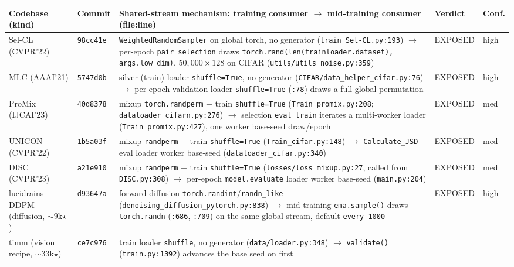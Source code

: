 \documentclass[10pt,letterpaper]{article}
\theoremstyle{remark}
\newcommand{\code}[1]{\texttt{#1}}
\begin{document}
\begin{table}[tbp]
\centering
\footnotesize
\setlength{\tabcolsep}{4pt}
\begin{tabular}{@{}L{2.15cm}L{1.0cm}L{6.4cm}L{1.15cm}L{1.0cm}@{}}
\toprule
Codebase (kind) & Commit & Shared-stream mechanism: training consumer $\to$
mid-training consumer (file:line) & Verdict & Conf. \\
\midrule
Sel-CL (CVPR'22) & \code{98cc41e} &
\code{WeightedRandomSampler} on global torch, no generator
(\code{train\_Sel-CL.py:193}) $\to$ per-epoch \code{pair\_selection} draws
\code{torch.rand(len(trainloader.dataset), args.low\_dim)}, $50{,}000\times128$
on CIFAR (\code{utils/utils\_noise.py:359}) &
EXPOSED & high \\
\addlinespace
MLC (AAAI'21) & \code{5747d0b} &
silver (train) loader \code{shuffle=True}, no generator
(\code{CIFAR/data\_helper\_cifar.py:76}) $\to$ per-epoch validation loader
\code{shuffle=True} (\code{:78}) draws a full global permutation &
EXPOSED & high \\
\addlinespace
ProMix (IJCAI'23) & \code{40d8378} &
mixup \code{torch.randperm} + train \code{shuffle=True}
(\code{Train\_promix.py:208}; \code{dataloader\_cifarn.py:276}) $\to$
selection \code{eval\_train} iterates a multi-worker loader
(\code{Train\_promix.py:427}), one worker base-seed draw/epoch & EXPOSED & med \\
\addlinespace
UNICON (CVPR'22) & \code{1b5a03f} &
mixup \code{randperm} + train \code{shuffle=True}
(\code{Train\_cifar.py:148}) $\to$ \code{Calculate\_JSD} eval loader
worker base-seed (\code{dataloader\_cifar.py:340}) & EXPOSED & med \\
\addlinespace
DISC (CVPR'23) & \code{a21e910} &
mixup \code{randperm} + train \code{shuffle=True}
(\code{losses/loss\_mixup.py:27}, called from \code{DISC.py:308}) $\to$
per-epoch \code{model.evaluate} loader worker base-seed (\code{main.py:204}) & EXPOSED & med \\
\addlinespace
lucidrains DDPM (diffusion, ${\sim}9$k$\star$) & \code{d93647a} &
forward-diffusion \code{torch.randint}/\code{randn\_like}
(\code{denoising\_diffusion\_pytorch.py:838}) $\to$ mid-training
\code{ema.sample()} draws \code{torch.randn} (\code{:686}, \code{:709}) on the
same global stream, default \code{every 1000} & EXPOSED & high \\
\addlinespace
timm (vision recipe, ${\sim}33$k$\star$) & \code{ce7c976} &
train loader \code{shuffle}, no generator (\code{data/loader.py:348}) $\to$
\code{validate()} (\code{train.py:1392}) advances the base seed on first

\end{tabular}
\end{table}
\end{document}
